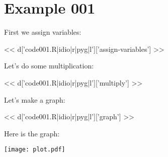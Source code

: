 \section{Example 001}

First we assign variables:

<< d['code001.R|idio|r|pyg|l']['assign-variables'] >>

Let's do some multiplication:

<< d['code001.R|idio|r|pyg|l']['multiply'] >>

Let's make a graph:

<< d['code001.R|idio|r|pyg|l']['graph'] >>

Here is the graph:

\texttt{[image: plot.pdf]}

